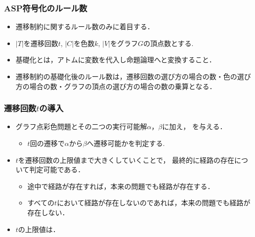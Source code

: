 
\begin{frame}\frametitle{ASP符号化のルール数}
  \begin{itemize}
    \item 遷移制約に関するルール数のみに着目する．
    \item $|T|$を遷移回数$t$, $|C|$を色数$k$, $|V|$をグラフ$G$の頂点数とする.
  \end{itemize}

  \begin{table}[t]
    \centering
    
  \end{table}

  \begin{itemize}
    \item 基礎化とは，アトムに変数を代入し命題論理へと変換すること．
    \item 遷移制約の基礎化後のルール数は，遷移回数の選び方の場合の数・色の選び方の場合の数・グラフの頂点の選び方の場合の数の乗算となる．
  \end{itemize}
\end{frame}


\begin{frame}\frametitle{遷移回数$t$の導入}

  \begin{itemize}
    \item グラフ点彩色問題とその二つの実行可能解$\alpha$，$\beta$に加え， 
          を与える．
    \begin{itemize}
      \item $t$回の遷移で$\alpha$から$\beta$へ遷移可能かを判定する. 
    \end{itemize}
    \item $t$を遷移回数の上限値まで大きくしていくことで，
          最終的に経路の存在について判定可能である．
    \begin{itemize}
      \item 途中で経路が存在すれば，本来の問題でも経路が存在する．
      \item すべての$t$において経路が存在しないのであれば，本来の問題でも経路が存在しない．
    \end{itemize}
    \item $t$の上限値は．
  \end{itemize}
  
\end{frame}

